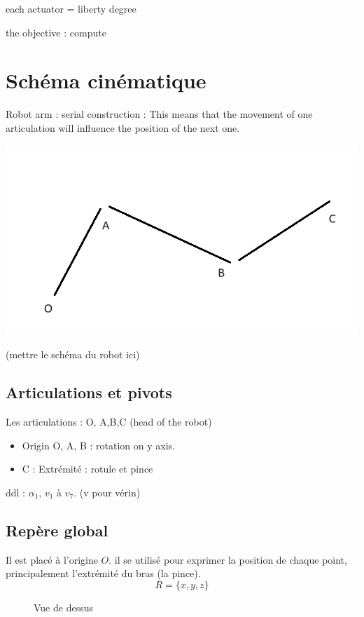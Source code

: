 \documentclass[12pt,a4paper]{article}
\begin{document}
each actuator = liberty degree

the objective : compute 

\newpage
\section{Schéma cinématique}

Robot arm : serial construction : 
This means that the movement of one articulation will influence the position of the next one. 

\includegraphics[scale=0.5]{robot_arm.png}

(mettre le schéma du robot ici)
\subsection{Articulations et pivots}
Les articulations : O, A,B,C (head of the robot)
\begin{itemize}
	\item Origin O, A, B : rotation on y axis.
	\item C : Extrémité : rotule et pince
\end{itemize}


ddl : $\alpha_1$, $v_1$ à $v_7$. (v pour vérin)\\


\subsection{Repère global}

Il est placé à l'origine $O$. il se utilisé pour exprimer la position de chaque point, principalement l'extrémité du bras (la pince).
\begin{equation}
R=\{x,y,z\}
\end{equation}
\medbreak
\medbreak

\begin{figure}[H]
	\centering
	\caption{Vue de dessus}
\end{figure}
\end{document}
